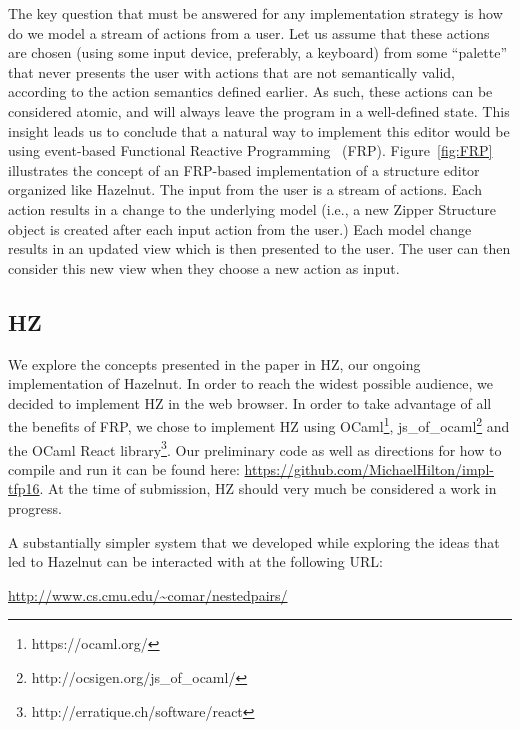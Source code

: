 \documentclass{llncs}
\begin{document}
The key question that must be answered for any implementation strategy is how do we model a stream of actions from a user. Let us assume that these actions are chosen (using some input device, preferably, a keyboard) from some ``palette'' that never presents the user with actions that are not semantically valid, according to the action semantics defined earlier. 
As such, these actions can be considered atomic, and will always leave the program in a well-defined state. 
This insight leads us to conclude that a natural way to implement this editor would be using event-based Functional Reactive Programming~\cite{Wan:2000:FRP:349299.349331} (FRP).
Figure~\ref{fig:FRP} illustrates the concept of an FRP-based implementation of a  structure editor organized like Hazelnut.
The input from the user is a stream of actions.  Each action results in a change to the underlying model (i.e., a new Zipper Structure object is created after each input action from the user.) 
Each model change results in an updated view which is then presented to the user.  The user can then consider this new view when they choose a new action as input.

\subsection{HZ}
We explore the concepts presented in the paper in HZ, our ongoing implementation of Hazelnut.
In order to reach the widest possible audience, we decided to implement HZ in the web browser.
In order to take advantage of all the benefits of FRP, we chose to implement HZ using OCaml\footnote{https://ocaml.org/}, js\_of\_ocaml\footnote{http://ocsigen.org/js\_of\_ocaml/} and the OCaml React library\footnote{http://erratique.ch/software/react}.
Our preliminary code as well as directions for how to compile and run it can be found here: \url{https://github.com/MichaelHilton/impl-tfp16}. 
At the time of submission, HZ should very much be considered a work in progress.

A substantially simpler system that we developed while exploring the ideas that led to Hazelnut can be interacted with at the following URL:

\url{http://www.cs.cmu.edu/~comar/nestedpairs/}
\end{document}
